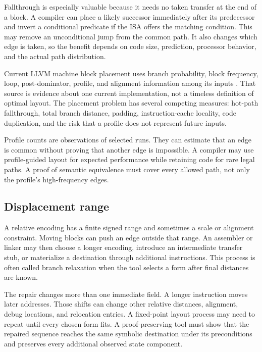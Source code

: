 Fallthrough is especially valuable because it needs no taken transfer at the
end of a block. A compiler can place a likely successor immediately after its
predecessor and invert a conditional predicate if the ISA offers the matching
condition. This may remove an unconditional jump from the common path. It also
changes which edge is taken, so the benefit depends on code size, prediction,
processor behavior, and the actual path distribution.

Current LLVM machine block placement uses branch probability, block frequency,
loop, post-dominator, profile, and alignment information among its inputs
\autocite{llvm2026blockplacement}. That source is evidence about one current
implementation, not a timeless definition of optimal layout. The placement
problem has several competing measures: hot-path fallthrough, total branch
distance, padding, instruction-cache locality, code duplication, and the risk
that a profile does not represent future inputs.

Profile counts are observations of selected runs. They can estimate that an
edge is common without proving that another edge is impossible. A compiler may
use profile-guided layout for expected performance while retaining code for
rare legal paths. A proof of semantic equivalence must cover every allowed
path, not only the profile's high-frequency edges.

\subsection{Displacement range}

A relative encoding has a finite signed range and sometimes a scale or
alignment constraint. Moving blocks can push an edge outside that range. An
assembler or linker may then choose a longer encoding, introduce an
intermediate transfer stub, or materialize a destination through additional
instructions. This process is often called branch relaxation when the tool
selects a form after final distances are known.

The repair changes more than one immediate field. A longer instruction moves
later addresses. Those shifts can change other relative distances, alignment,
debug locations, and relocation entries. A fixed-point layout process may need
to repeat until every chosen form fits. A proof-preserving tool must show that
the repaired sequence reaches the same symbolic destination under its
preconditions and preserves every additional observed state component.


